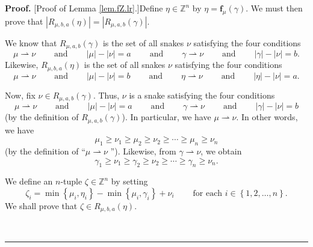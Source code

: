 \documentclass[numbers=enddot,12pt,final,onecolumn,notitlepage]{scrartcl}%
\theoremstyle{definition}
\newenvironment{proof}[1][Proof]{\noindent\textbf{#1.} }{\ \rule{0.5em}{0.5em}}
\begin{document}
\begin{proof}
[Proof of Lemma \ref{lem.fZ.lr}.]Define $\eta\in\mathbb{Z}^{n}$ by
$\eta=\mathbf{f}_{\mu}\left(  \gamma\right)  $. We must then prove that
$\left\vert R_{\mu,b,a}\left(  \eta\right)  \right\vert =\left\vert
R_{\mu,a,b}\left(  \gamma\right)  \right\vert $.

We know that $R_{\mu,a,b}\left(  \gamma\right)  $ is the set of all snakes
$\nu$ satisfying the four conditions%
\[
\mu\rightharpoonup\nu\ \ \ \ \ \ \ \ \ \ \text{and}%
\ \ \ \ \ \ \ \ \ \ \left\vert \mu\right\vert -\left\vert \nu\right\vert
=a\ \ \ \ \ \ \ \ \ \ \text{and}\ \ \ \ \ \ \ \ \ \ \gamma\rightharpoonup
\nu\ \ \ \ \ \ \ \ \ \ \text{and}\ \ \ \ \ \ \ \ \ \ \left\vert \gamma
\right\vert -\left\vert \nu\right\vert =b.
\]
Likewise, $R_{\mu,b,a}\left(  \eta\right)  $ is the set of all snakes $\nu$
satisfying the four conditions%
\[
\mu\rightharpoonup\nu\ \ \ \ \ \ \ \ \ \ \text{and}%
\ \ \ \ \ \ \ \ \ \ \left\vert \mu\right\vert -\left\vert \nu\right\vert
=b\ \ \ \ \ \ \ \ \ \ \text{and}\ \ \ \ \ \ \ \ \ \ \eta\rightharpoonup
\nu\ \ \ \ \ \ \ \ \ \ \text{and}\ \ \ \ \ \ \ \ \ \ \left\vert \eta
\right\vert -\left\vert \nu\right\vert =a.
\]


Now, fix $\nu\in R_{\mu,a,b}\left(  \gamma\right)  $. Thus, $\nu$ is a snake
satisfying the four conditions%
\[
\mu\rightharpoonup\nu\ \ \ \ \ \ \ \ \ \ \text{and}%
\ \ \ \ \ \ \ \ \ \ \left\vert \mu\right\vert -\left\vert \nu\right\vert
=a\ \ \ \ \ \ \ \ \ \ \text{and}\ \ \ \ \ \ \ \ \ \ \gamma\rightharpoonup
\nu\ \ \ \ \ \ \ \ \ \ \text{and}\ \ \ \ \ \ \ \ \ \ \left\vert \gamma
\right\vert -\left\vert \nu\right\vert =b
\]
(by the definition of $R_{\mu,a,b}\left(  \gamma\right)  $). In particular, we
have $\mu\rightharpoonup\nu$. In other words, we have%
\begin{equation}
\mu_{1}\geq\nu_{1}\geq\mu_{2}\geq\nu_{2}\geq\cdots\geq\mu_{n}\geq\nu_{n}
\label{pf.lem.fZ.lr.3a}%
\end{equation}
(by the definition of \textquotedblleft$\mu\rightharpoonup\nu$%
\textquotedblright). Likewise, from $\gamma\rightharpoonup\nu$, we obtain%
\begin{equation}
\gamma_{1}\geq\nu_{1}\geq\gamma_{2}\geq\nu_{2}\geq\cdots\geq\gamma_{n}\geq
\nu_{n}. \label{pf.lem.fZ.lr.3b}%
\end{equation}


We define an $n$-tuple $\zeta\in\mathbb{Z}^{n}$ by setting
\[
\zeta_{i}=\min\left\{  \mu_{i},\eta_{i}\right\}  -\min\left\{  \mu_{i}%
,\gamma_{i}\right\}  +\nu_{i}\ \ \ \ \ \ \ \ \ \ \text{for each }i\in\left\{
1,2,\ldots,n\right\}  .
\]
We shall prove that $\zeta\in R_{\mu,b,a}\left(  \eta\right)  $.


\end{proof}
\end{document}
